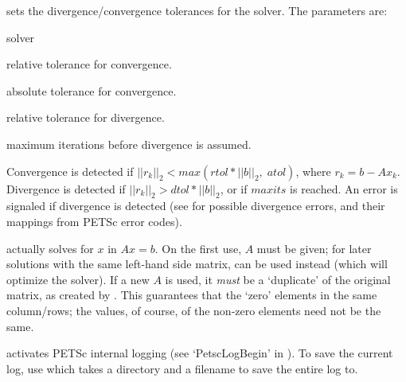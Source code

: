  sets the divergence/convergence tolerances for the
solver. The parameters are:
\begin{description}
\vspace{-0.5\baselineskip}
\baselineskip
\item[\textproc{K}] solver
\item[\textproc{rtol}] relative tolerance for convergence. 
\item[\textproc{atol}] absolute tolerance for convergence.
\item[\textproc{dtol}] relative tolerance for divergence.
\item[\textproc{maxits}] maximum iterations before divergence is assumed.
\vspace{-0.75\baselineskip}
\end{description}
Convergence is detected if $||r_k||_2 < max(rtol * ||b||_2,\;atol)$,
where $r_k = b - Ax_k$. Divergence is detected if $||r_k||_2 > dtol *
||b||_2$, or if $maxits$ is reached. An error is signaled if
divergence is detected (see  for possible divergence
errors, and their mappings from PETSc error codes).

 actually solves for $x$ in $Ax = b$. On the first
use, $A$ must be given; for later solutions with the same left-hand
side matrix,  can be used instead (which will optimize
the solver). If a new $A$ is used, it \emph{must} be a `duplicate' of
the original matrix, as created by . This guarantees
that the `zero' elements in the same column/rows; the values, of
course, of the non-zero elements need not be the same.

 activates PETSc internal logging (see
`PetscLogBegin' in \citet{balay:2004}). To save the current log, use
 which takes a directory and a filename to save
the entire log to.

